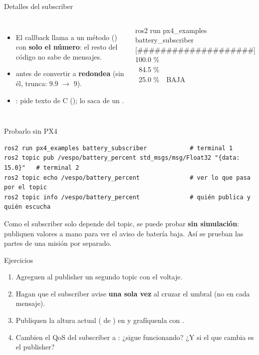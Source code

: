 \begin{frame}{Detalles del subscriber}
  \begin{columns}[c]
    \small
    \begin{itemize}
      \item El callback llama a un método () con \textbf{solo el número}: el resto del código
        no sabe de mensajes.
      \item {} antes de convertir a  \textbf{redondea} (sin él,  trunca:
        9.9 $\rightarrow$ 9).
      \item {}:  pide texto de C ();  lo saca de un
        .
    \end{itemize}
    \begin{terminal}{ros2 run px4\_examples battery\_subscriber}
[\#\#\#\#\#\#\#\#\#\#\#\#\#\#\#\#\#\#\#\#] 100.0 \%\\
[\#\#\#\#\#\#\#\#\#\#\#\#\#\#\#\#\#.\,.\,.] \ 84.5 \%\\
[\#\#\#\#\#.\,.\,.\,.\,.\,.\,.\,.\,.\,.\,.\,.\,.\,.\,.] \ 25.0 \%\ \ BAJA
    \end{terminal}
  \end{columns}
\end{frame}

\begin{frame}[fragile]{Probarlo sin PX4}
  \begin{lstlisting}[style=bash]
ros2 run px4_examples battery_subscriber            # terminal 1
ros2 topic pub /vespo/battery_percent std_msgs/msg/Float32 "{data: 15.0}"   # terminal 2
ros2 topic echo /vespo/battery_percent              # ver lo que pasa por el topic
ros2 topic info /vespo/battery_percent              # quién publica y quién escucha
  \end{lstlisting}
  \begin{idea}
    \small Como el subscriber solo depende del topic, se puede probar \textbf{sin simulación}: publiquen
    valores a mano para ver el aviso de batería baja. Así se prueban las partes de una misión por separado.
  \end{idea}
\end{frame}

\begin{frame}{Ejercicios}
  \begin{enumerate}\small
    \item Agreguen al publisher un segundo topic  con el voltaje.
    \item Hagan que el subscriber avise \textbf{una sola vez} al cruzar el umbral (no en cada mensaje).
    \item Publiquen la altura actual ( de ) en
       y grafíquenla con .
    \item Cambien el QoS del subscriber a : ¿sigue funcionando? ¿Y si el que cambia es el
      publisher?
  \end{enumerate}
\end{frame}
